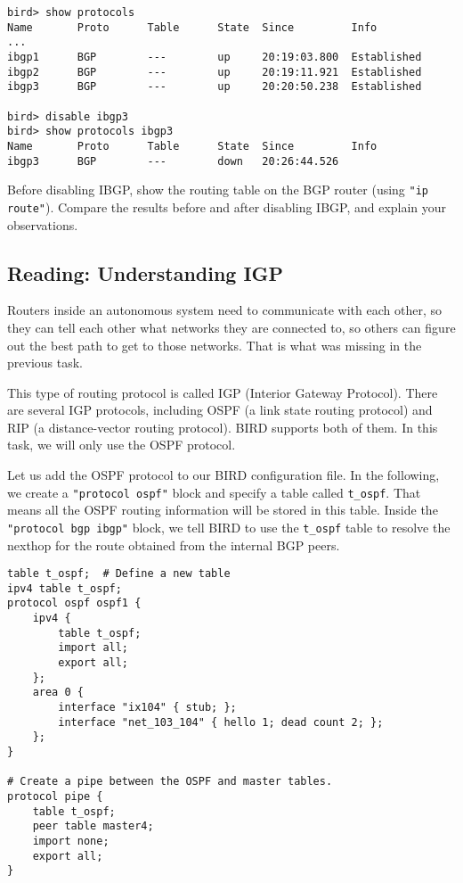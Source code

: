 \begin{lstlisting}
bird> show protocols
Name       Proto      Table      State  Since         Info
...
ibgp1      BGP        ---        up     20:19:03.800  Established
ibgp2      BGP        ---        up     20:19:11.921  Established
ibgp3      BGP        ---        up     20:20:50.238  Established

bird> disable ibgp3 
bird> show protocols ibgp3
Name       Proto      Table      State  Since         Info
ibgp3      BGP        ---        down   20:26:44.526
\end{lstlisting}
 
Before disabling IBGP, show the routing table 
on the BGP router (using \texttt{"ip route"}). Compare the 
results before and after disabling IBGP, and explain
your observations. 


\subsection{Reading: Understanding IGP} 

Routers inside an autonomous system need to
communicate with each other, so they can tell each other
what networks they are connected to, so others can figure out
the best path to get to those networks. That is what
was missing in the previous task.


This type of routing protocol is called IGP (Interior Gateway Protocol).
There are several IGP protocols, including OSPF (a link state routing protocol) and RIP (a
distance-vector routing protocol). BIRD supports both of them. In this
task, we will only use the OSPF protocol.

Let us add the OSPF protocol to our BIRD configuration file. In the following,
we create a \texttt{"protocol ospf"} block and specify a table called \texttt{t\_ospf}.
That means all the OSPF routing information will be stored in
this table. Inside the \texttt{"protocol bgp ibgp"} block, we tell BIRD to
use the \texttt{t\_ospf} table to resolve the nexthop for
the route obtained from the internal BGP peers.

\begin{lstlisting}
table t_ospf;  # Define a new table 
ipv4 table t_ospf;
protocol ospf ospf1 {
    ipv4 {
        table t_ospf;
        import all;
        export all;
    };
    area 0 {
        interface "ix104" { stub; };
        interface "net_103_104" { hello 1; dead count 2; };
    };
}

# Create a pipe between the OSPF and master tables. 
protocol pipe {
    table t_ospf;
    peer table master4;
    import none;
    export all;
}
\end{lstlisting}

